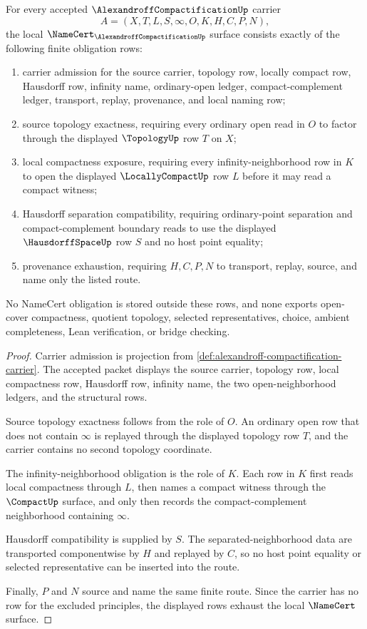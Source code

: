 \begin{theorem}
\label{thm:alexandroff-compactification-namecert-obligations}
For every accepted $\AlexandroffCompactificationUp$ carrier
$$
A=(X,T,L,S,\infty,O,K,H,C,P,N),
$$
the local $\NameCert_{\AlexandroffCompactificationUp}$ surface consists exactly of the following finite obligation rows:
\begin{enumerate}
\item carrier admission for the source carrier, topology row, locally compact row, Hausdorff row, infinity name, ordinary-open ledger, compact-complement ledger, transport, replay, provenance, and local naming row;
\item source topology exactness, requiring every ordinary open read in $O$ to factor through the displayed $\TopologyUp$ row $T$ on $X$;
\item local compactness exposure, requiring every infinity-neighborhood row in $K$ to open the displayed $\LocallyCompactUp$ row $L$ before it may read a compact witness;
\item Hausdorff separation compatibility, requiring ordinary-point separation and compact-complement boundary reads to use the displayed $\HausdorffSpaceUp$ row $S$ and no host point equality;
\item provenance exhaustion, requiring $H,C,P,N$ to transport, replay, source, and name only the listed route.
\end{enumerate}
No NameCert obligation is stored outside these rows, and none exports open-cover compactness, quotient topology, selected representatives, choice, ambient completeness, Lean verification, or bridge checking.
\end{theorem}
\begin{proof}
Carrier admission is projection from \autoref{def:alexandroff-compactification-carrier}. The accepted packet displays the source carrier, topology row, local compactness row, Hausdorff row, infinity name, the two open-neighborhood ledgers, and the structural rows.

Source topology exactness follows from the role of $O$. An ordinary open row that does not contain $\infty$ is replayed through the displayed topology row $T$, and the carrier contains no second topology coordinate.

The infinity-neighborhood obligation is the role of $K$. Each row in $K$ first reads local compactness through $L$, then names a compact witness through the $\CompactUp$ surface, and only then records the compact-complement neighborhood containing $\infty$.

Hausdorff compatibility is supplied by $S$. The separated-neighborhood data are transported componentwise by $H$ and replayed by $C$, so no host point equality or selected representative can be inserted into the route.

Finally, $P$ and $N$ source and name the same finite route. Since the carrier has no row for the excluded principles, the displayed rows exhaust the local $\NameCert$ surface.
\end{proof}

